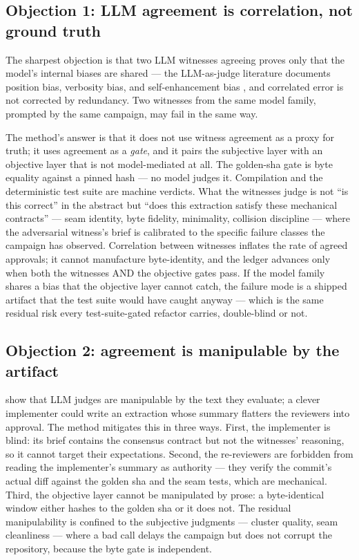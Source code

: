 \documentclass[11pt]{article}
\theoremstyle{definition}
\theoremstyle{plain}
\theoremstyle{remark}
\begin{document}
\subsection{Objection 1: LLM agreement is correlation, not ground truth}

The sharpest objection is that two LLM witnesses agreeing proves only that
the model's internal biases are shared --- the LLM-as-judge literature
documents position bias, verbosity bias, and self-enhancement bias
\citep{zheng2023judging}, and correlated error is not corrected by
redundancy. Two witnesses from the same model family, prompted by the same
campaign, may fail in the same way.

The method's answer is that it does not use witness agreement as a proxy for
truth; it uses agreement as a \emph{gate}, and it pairs the subjective layer
with an objective layer that is not model-mediated at all. The golden-sha
gate is byte equality against a pinned hash --- no model judges it.
Compilation and the deterministic test suite are machine verdicts. What the
witnesses judge is not ``is this correct'' in the abstract but ``does this
extraction satisfy these mechanical contracts'' --- seam identity, byte
fidelity, minimality, collision discipline --- where the adversarial
witness's brief is calibrated to the specific failure classes the campaign
has observed. Correlation between witnesses inflates the rate of agreed
approvals; it cannot manufacture byte-identity, and the ledger advances only
when both the witnesses AND the objective gates pass. If the model family
shares a bias that the objective layer cannot catch, the failure mode is a
shipped artifact that the test suite would have caught anyway --- which is
the same residual risk every test-suite-gated refactor carries, double-blind
or not.

\subsection{Objection 2: agreement is manipulable by the artifact}

\citet{chan2023chateval} show that LLM judges are manipulable by the text
they evaluate; a clever implementer could write an extraction whose summary
flatters the reviewers into approval. The method mitigates this in three
ways. First, the implementer is blind: its brief contains the consensus
contract but not the witnesses' reasoning, so it cannot target their
expectations. Second, the re-reviewers are forbidden from reading the
implementer's summary as authority --- they verify the commit's actual diff
against the golden sha and the seam tests, which are mechanical. Third, the
objective layer cannot be manipulated by prose: a byte-identical window
either hashes to the golden sha or it does not. The residual manipulability
is confined to the subjective judgments --- cluster quality, seam
cleanliness --- where a bad call delays the campaign but does not corrupt the
repository, because the byte gate is independent.
\end{document}

